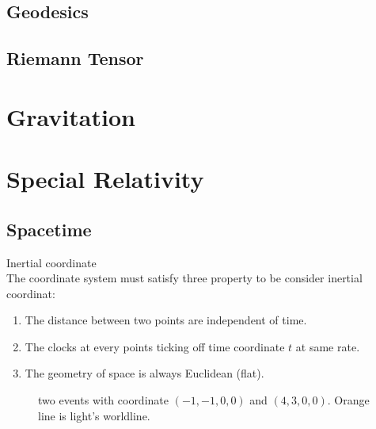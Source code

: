 \documentclass[12pt]{article}
\theoremstyle{mystyle}{\newtheorem{definition}{Definition}[section]}
\theoremstyle{mystyle}{\newtheorem{theorem}[definition]{Theorem}}
\theoremstyle{mystyle}{\newtheorem*{remark}{Remark}}
\theoremstyle{mystyle}{\newtheorem*{example}{Example}}
\theoremstyle{mystyle}{\newtheorem*{examples}{Examples}}
\theoremstyle{cstyle}{\newtheorem*{cthm}{}}
\begin{document}
\subsection{Geodesics}
\subsection{Riemann Tensor}
\section{Gravitation}



\newpage
\appendix
{}

\section{Special Relativity}


\subsection{Spacetime}
\begin{definition}
    Inertial coordinate \\
    The coordinate system must satisfy three property to be consider inertial coordinat:
    \begin{enumerate}
        \item The distance between two points are independent of time.
        \item The clocks at every points ticking off time coordinate $t$ at same rate.
        \item The geometry of space is always Euclidean (flat).
    \end{enumerate}
\end{definition}

\begin{figure}[ht]
    \begin{center}
            \caption[]{two events with coordinate $(-1, -1, 0, 0)$ and $(4, 3, 0, 0)$. Orange line is light's worldline.}
    \end{center}
\end{figure}
\end{document}
